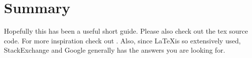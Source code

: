 \section{Summary}
Hopefully this has been a useful short guide. Please also check out the tex source code. For more inspiration check out \cite{wikibookLatex}. Also, since \LaTeX is so extensively used, StackExchange and Google generally has the answers you are looking for.




